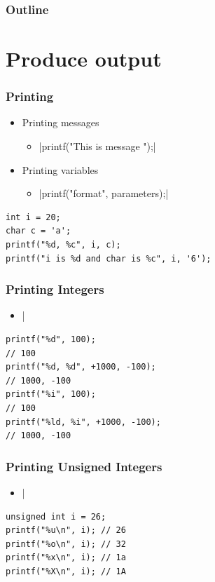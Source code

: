\documentclass{../c-lecture}
\subtitle{Calculation}
\begin{document}
\begin{frame}
  \titlepage{}
\end{frame}
\begin{frame}
  \frametitle{Outline}
  \tableofcontents{}
\end{frame}

\section{Produce output}

\begin{frame}[fragile]
  \frametitle{Printing}
  \begin{itemize}
    \item Printing messages
    \begin{itemize}
      \item {}|printf("This is message \n");|
    \end{itemize}
    \item Printing variables
    \begin{itemize}
      \item {}|printf("format", parameters);|
    \end{itemize}
  \end{itemize}
  \begin{verbatim}
int i = 20;
char c = 'a';
printf("%d, %c", i, c);
printf("i is %d and char is %c", i, '6');
  \end{verbatim}
\end{frame}

\begin{frame}[fragile]
  \frametitle{Printing Integers}
  \begin{itemize}
    \item {}|%
  \end{itemize}
  \begin{verbatim}
printf("%d", 100);
// 100
printf("%d, %d", +1000, -100);
// 1000, -100
printf("%i", 100);
// 100
printf("%ld, %i", +1000, -100);
// 1000, -100
  \end{verbatim}
\end{frame}

\begin{frame}[fragile]
  \frametitle{Printing Unsigned Integers}
  \begin{itemize}
    \item {}|%
  \end{itemize}
  \begin{verbatim}
unsigned int i = 26;
printf("%u\n", i); // 26
printf("%o\n", i); // 32
printf("%x\n", i); // 1a
printf("%X\n", i); // 1A
  \end{verbatim}
\end{frame}
\end{document}
